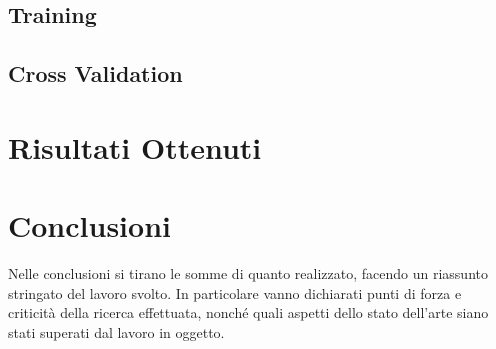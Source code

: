\documentclass[12pt,italian]{report}
\begin{document}
\subsection{Training}



\subsection{Cross Validation}



\section{Risultati Ottenuti}
\label{sec:risultati}


% 
% 
\section{Conclusioni}

Nelle conclusioni si tirano le somme di quanto realizzato, facendo un riassunto stringato del lavoro svolto. In particolare vanno dichiarati punti di forza e criticità della ricerca effettuata, nonché quali aspetti dello stato dell'arte siano stati superati dal lavoro in oggetto.

%
%





\closingpage
\end{document}
